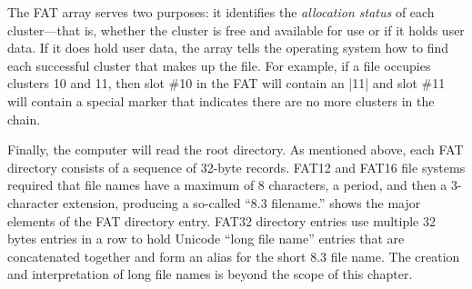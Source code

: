 The FAT array serves two purposes: it identifies the \emph{allocation
  status} of each cluster---that is, whether the cluster is free and
available for use or if it holds user data. If it does hold user data,
the array tells the operating system how to find each successful
cluster that makes up the file.  For example, if a file occupies
clusters 10 and 11, then slot \#10 in the FAT will contain an |11| and
slot \#11 will contain a special marker that indicates there are no
more clusters in the chain.

Finally, the computer will read the root directory. As mentioned
above, each FAT directory consists of a sequence of 32-byte
records. FAT12 and FAT16 file systems required that file names have a
maximum of 8 characters, a period, and then a 3-character extension,
producing a so-called ``8.3 filename.''  shows
the major elements of the FAT directory entry. FAT32 directory entries
use multiple 32 bytes entries in a row to hold Unicode ``long file
name'' entries that are concatenated together and form an alias for
the short 8.3 file name. The creation and interpretation of long file
names is beyond the scope of this chapter.


